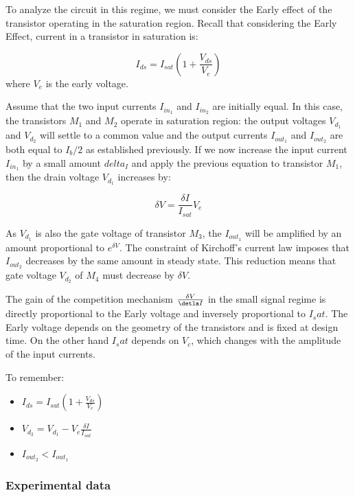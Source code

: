 To analyze the circuit in this regime, we must consider the Early effect of the transistor operating in the saturation region. Recall that considering the Early Effect, current in a transistor in saturation is: 

\begin{equation}
    I_{ds} = I_{sat}(1 + \frac{V_{ds}}{V_e})
\end{equation}
where $V_e$ is the early voltage. 

Assume that the two input currents $I_{in_1}$ and $I_{in_2}$ are initially equal. In this case, the transistors $M_1$ and $M_2$ operate in saturation region: the output voltages $V_d_1$ and $V_d_2$ will settle to a common value and the output currents $I_{out_1}$ and $I_{out_2}$ are both equal to $I_b/2$ as established previously. If we now increase the input current $I_{in_1}$ by a small amount $delta_I$ and apply the previous equation to transistor $M_1$, then the drain voltage $V_d_1$ increases by: 

\begin{equation}
    \delta V = \frac{\delta I}{I_{sat}}V_e
\end{equation}

As $V_d_1$ is also the gate voltage of transistor $M_3$, the $I_{out_1}$ will be amplified by an amount proportional to $e^{\delta V}$. The constraint of Kirchoff's current law imposes that $I_{out_2}$ decreases by the same amount in steady state. This reduction means that gate voltage $V_d_2$ of $M_4$ must decrease by $\delta V$. 

The gain of the competition mechanism $\frac{\delta V}{\detla I}$ in the small signal regime is directly proportional to the Early voltage and inversely proportional to $I_sat$. The Early voltage depends on the geometry of the transistors and is fixed at design time. On the other hand $I_sat$ depends on $V_c$, which changes with the amplitude of the input currents. 

To remember: 

\begin{itemize}
    \item $I_{ds} = I_{sat}(1 + \frac{V_{ds}}{V_e})$
    \item $V_d_2 = V_d_1 - V_e \frac{\delta I}{I_{sat}}$
    \item $I_{out}_2 < I_{out}_1$
\end{itemize}

\subsubsection{Experimental data}

